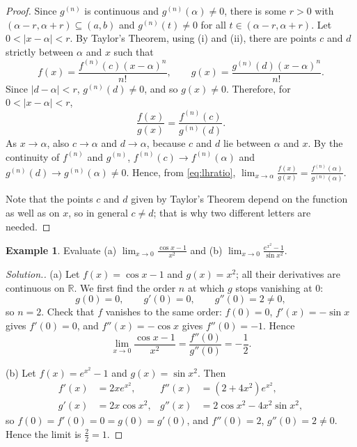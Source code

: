 \documentclass[11pt,a4paper]{article}
\numberwithin{equation}{section}
\theoremstyle{definition}
\newtheorem{exa}[thm]{Example}
\newenvironment{solution}
  {\renewcommand{\qedsymbol}{}\begin{proof}[\textit{Solution}.]}
  {\end{proof}}
\begin{document}
\begin{proof}
Since $g^{(n)}$ is continuous and $g^{(n)}(\alpha) \neq 0$, there is some $r> 0$ with $(\alpha - r, \alpha + r)\subseteq (a,b)$ and $g^{(n)}(t)\neq 0$ for all $t\in(\alpha - r, \alpha + r)$. Let $0 < |x - \alpha| < r$. By Taylor's Theorem, using (i) and (ii), there are points $c$ and $d$ strictly between $\alpha$ and $x$ such that
$$f(x) = \frac{f^{(n)}(c) (x - \alpha)^n}{n!}, \qquad g(x) = \frac{g^{(n)}(d) (x - \alpha)^n}{n!} .$$
Since $|d-\alpha|<r$, $g^{(n)}(d)\neq 0$, and so $g(x)\neq 0$. Therefore, for $0< |x - \alpha| < r$,
\begin{equation}\label{eq:lhratio}
\frac{f(x)}{g(x)} = \frac{f^{(n)}(c)}{g^{(n)}(d)} .
\end{equation}
As $x\longrightarrow \alpha$, also $c\longrightarrow \alpha$ and $d\longrightarrow \alpha$, because $c$ and $d$ lie between $\alpha$ and $x$. By the continuity of $f^{(n)}$ and $g^{(n)}$, $f^{(n)}(c)\longrightarrow f^{(n)}(\alpha)$ and $g^{(n)}(d)\longrightarrow g^{(n)}(\alpha)\neq0$. Hence, from \eqref{eq:lhratio}, $\lim_{x\rightarrow \alpha} \frac{f(x)}{g(x)} = \frac{f^{(n)}(\alpha)}{g^{(n)}(\alpha)}$.

Note that the points $c$ and $d$ given by Taylor's Theorem depend on the function as well as on $x$, so in general $c\neq d$; that is why two different letters are needed.
\end{proof}


\begin{exa}
Evaluate (a) $\displaystyle\lim_{x\rightarrow 0} \frac{\cos x - 1}{x^2}$ and (b) $\displaystyle\lim_{x \rightarrow 0} \frac{e^{x^2} - 1}{\sin x^2}$.
\end{exa}

\begin{solution}
(a) Let $f(x) = \cos x - 1$ and $g(x) = x^2$; all their derivatives are continuous on $\mathbb{R}$. We first find the order $n$ at which $g$ stops vanishing at $0$:
$$g(0) = 0,\qquad g'(0) = 0,\qquad g''(0) = 2\neq0,$$
so $n = 2$. Check that $f$ vanishes to the same order: $f(0) = 0$, $f'(x) = -\sin x$ gives $f'(0) = 0$, and $f''(x) = -\cos x$ gives $f''(0) = -1$. Hence
$$\lim_{x\rightarrow 0} \frac{\cos x - 1}{x^2} = \frac{f''(0)}{g''(0)}  = -\frac{1}{2} .$$

(b) Let $f(x) = e^{x^2} - 1$ and $g(x) = \sin x^2$. Then
\begin{align*}
f'(x) &= 2x e^{x^2}, & f''(x) &= (2+4x^2)e^{x^2},\\
g'(x) &= 2x\cos x^2, & g''(x) &= 2\cos x^2 - 4x^2\sin x^2 ,
\end{align*}
so $f(0) = f'(0) = 0 = g(0) = g'(0)$, and $f''(0) = 2$, $g''(0) = 2\neq0$. Hence the limit is $\frac{2}{2} = 1$.
\end{solution}
\end{document}
